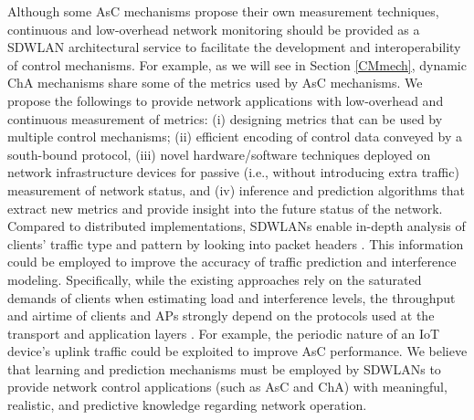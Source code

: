 Although some AsC mechanisms propose their own measurement techniques, continuous and low-overhead network monitoring should be provided as a SDWLAN architectural service to facilitate the development and interoperability of control mechanisms.
For example, as we will see in Section \ref{CMmech}, dynamic ChA mechanisms share some of the metrics used by AsC mechanisms.
We propose the followings to provide network applications with low-overhead and continuous measurement of metrics:
(i) designing metrics that can be used by multiple control mechanisms; 
(ii) efficient encoding of control data conveyed by a south-bound protocol, 
(iii) novel hardware/software techniques deployed on network infrastructure devices for passive (i.e., without introducing extra traffic) measurement of network status, 
and (iv) inference and prediction algorithms that extract new metrics and provide insight into the future status of the network.
Compared to distributed implementations, SDWLANs enable in-depth analysis of clients' traffic type and pattern by looking into packet headers \cite{gibb2013design,akyildiz2014roadmap,ng2015developing,Yoon2017,oliveira_characterizing_2016}.
This information could be employed to improve the accuracy of traffic prediction and interference modeling.
Specifically, while the existing approaches rely on the saturated demands of clients when estimating load and interference levels, the throughput and airtime of clients and APs strongly depend on the protocols used at the transport and application layers \cite{sinky_analysis_2015,IOT-future1,hobfeld_challenges_2012}.
For example, the periodic nature of an IoT device's uplink traffic could be exploited to improve AsC performance.
We believe that learning and prediction mechanisms must be employed by SDWLANs to provide network control applications (such as AsC and ChA) with meaningful, realistic, and predictive knowledge regarding network operation.





